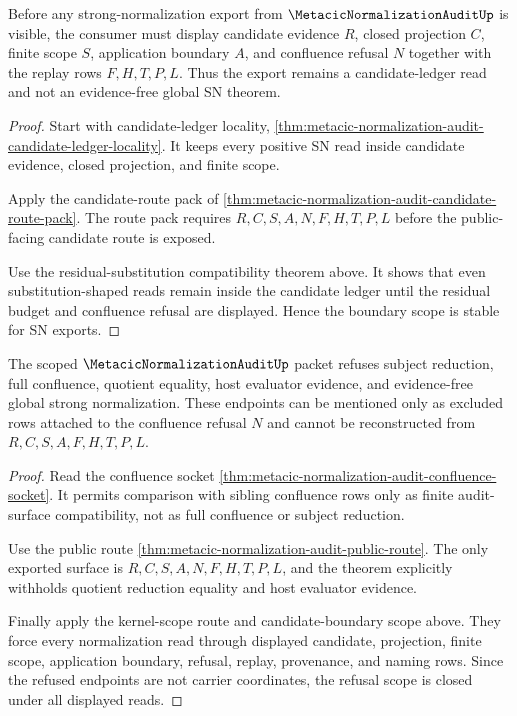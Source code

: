 \begin{theorem}
\label{thm:metacic-normalization-audit-candidate-boundary-scope}
Before any strong-normalization export from $\MetacicNormalizationAuditUp$ is visible, the consumer must display candidate evidence $R$, closed projection $C$, finite scope $S$, application boundary $A$, and confluence refusal $N$ together with the replay rows $F,H,T,P,L$. Thus the export remains a candidate-ledger read and not an evidence-free global SN theorem.
\end{theorem}
\begin{proof}
Start with candidate-ledger locality, \autoref{thm:metacic-normalization-audit-candidate-ledger-locality}. It keeps every positive SN read inside candidate evidence, closed projection, and finite scope.

Apply the candidate-route pack of \autoref{thm:metacic-normalization-audit-candidate-route-pack}. The route pack requires $R,C,S,A,N,F,H,T,P,L$ before the public-facing candidate route is exposed.

Use the residual-substitution compatibility theorem above. It shows that even substitution-shaped reads remain inside the candidate ledger until the residual budget and confluence refusal are displayed. Hence the boundary scope is stable for SN exports.
\end{proof}

\begin{theorem}
\label{thm:metacic-normalization-audit-refusal-scope}
The scoped $\MetacicNormalizationAuditUp$ packet refuses subject reduction, full confluence, quotient equality, host evaluator evidence, and evidence-free global strong normalization. These endpoints can be mentioned only as excluded rows attached to the confluence refusal $N$ and cannot be reconstructed from $R,C,S,A,F,H,T,P,L$.
\end{theorem}
\begin{proof}
Read the confluence socket \autoref{thm:metacic-normalization-audit-confluence-socket}. It permits comparison with sibling confluence rows only as finite audit-surface compatibility, not as full confluence or subject reduction.

Use the public route \autoref{thm:metacic-normalization-audit-public-route}. The only exported surface is $R,C,S,A,N,F,H,T,P,L$, and the theorem explicitly withholds quotient reduction equality and host evaluator evidence.

Finally apply the kernel-scope route and candidate-boundary scope above. They force every normalization read through displayed candidate, projection, finite scope, application boundary, refusal, replay, provenance, and naming rows. Since the refused endpoints are not carrier coordinates, the refusal scope is closed under all displayed reads.
\end{proof}

